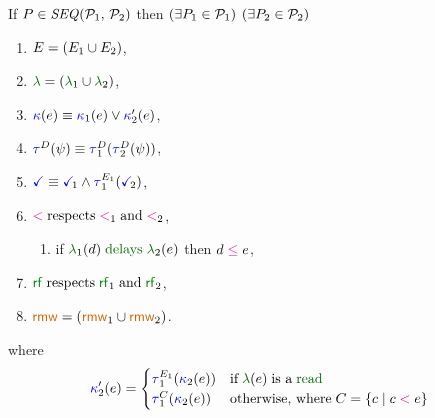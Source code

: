 \begin{scope}
  \noindent
  If $\aPS \in \sSEMI{\aPSS_1}{\aPSS_2}$ then $(\exists P_1\in\mathcal{P}_1)$ $(\exists P_2\in\mathcal{P}_2)$
  \begin{multicols}{2}
    \begin{enumerate}[topsep=0pt,label=(\textsc{s}\arabic*),ref=\textsc{s}\arabic*]
    \item \label{seq-E}
      $E = (E_1\cup E_2)$,
    \item \label{seq-lambda}
      ${\labeling}=\PBR{{\labeling_1}\cup {\labeling_2}}$, 
    \item \label{seq-kappa}
      ${\color{blue}\kappa}(e) \mathrel{\equiv} {{\color{blue}\kappa}_1(e)\lor{\color{blue}\kappa}'_2(e)}$,
    \item \label{seq-tau}
      $\aTr{\bEvs}{\bForm} \riff \aTr[1]{\bEvs}{\aTr[2]{\bEvs}{\bForm}}$,
    \item \label{seq-term}
      $\aTerm \riff \aTerm[1]\land\aTrAbbrv[1]{\aEvs_1}{\aTerm[2]}$,
    \item \label{seq-le}
      ${\lt}\rextends{\lt_1}{\lt_2}$,
      \begin{enumerate}[leftmargin=0pt]
      \item \label{seq-le-delays}
        if $\labeling_1(\bEv) \rdelays \labeling_2(\aEv)$ then $\bEv\le\aEv$,
      \end{enumerate}
    \item \label{par-rf}
      ${\rrfx}\rextends{\rrfx_1}{\rrfx_2}$,    
      \setcounter{enumi}{\value{Brmw}}
    \item \label{par-rmw}
      ${\rrmw}=\PBR{{\rrmw_1}\cup{\rrmw_2}}$.
    \end{enumerate}
  \end{multicols}
  \vspace{-.7\baselineskip}
  where
  \begin{displaymath}
    \labelingForm'_2(\aEv)=
    \begin{cases}
      \aTrAbbrv[1]{\aEvs_1}{\labelingForm_2(\aEv)} & \text{if}\; \labeling(\aEv) \;\text{is a}\sread
      \\
      \aTr[1]{\Cdown{\aEv}}{\labelingForm_2(\aEv)} & \text{otherwise, where}\; \Cdown{\aEv}=\{ \cEv \mid \cEv \lt \aEv \}
    \end{cases}
  \end{displaymath}


\end{scope}
